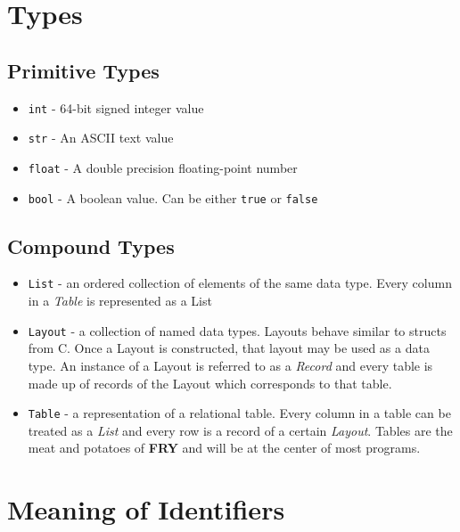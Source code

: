 \documentclass{article}
\begin{document}
\section{Types}
\subsection{Primitive Types}
\label{sec:prims}
\begin{itemize}
\item \texttt{int} - 64-bit signed integer value

\item \texttt{str} - An ASCII text value

\item \texttt{float} - A double precision floating-point number

\item \texttt{bool} - A boolean value. Can be either \texttt{true} or \texttt{false}

\end{itemize}

\subsection{Compound Types}

\begin{itemize} 

\item \texttt{List} - an ordered collection of elements of the same data type. Every column in a \emph{Table} is represented as a List

\item \texttt{Layout} - a collection of named data types. Layouts behave similar to structs from C. Once a Layout is constructed, that layout may be used as a data type.  An instance of a Layout is referred to as a \emph{Record} and every table is made up of records of the Layout which corresponds to that table.

\item \texttt{Table} - a representation of a relational table. Every column in a table can be treated as a \emph{List} and every row is a record of a certain \emph{Layout}. Tables are the meat and potatoes of \textbf{FRY} and will be at the center of most programs.

\end{itemize}

\section{Meaning of Identifiers}
\end{document}
